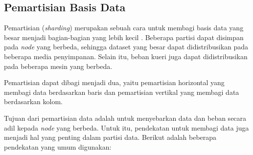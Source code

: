 \subsection{Pemartisian Basis Data}

Pemartisian (\textit{sharding}) merupakan sebuah cara untuk membagi basis data yang besar menjadi bagian-bagian yang lebih kecil \parencite{dataIntensiveApplications}. Beberapa partisi dapat disimpan pada \textit{node} yang berbeda, sehingga dataset yang besar dapat didistribusikan pada beberapa media penyimpanan. Selain itu, beban kueri juga dapat didistribusikan pada beberapa mesin yang berbeda.

Pemartisian dapat dibagi menjadi dua, yaitu pemartisian horizontal yang membagi data berdasarkan baris dan pemartisian vertikal yang membagi data berdasarkan kolom.

Tujuan dari pemartisian data adalah untuk menyebarkan data dan beban secara adil kepada \textit{node} yang berbeda. Untuk itu, pendekatan untuk membagi data juga menjadi hal yang penting dalam partisi data. Berikut adalah beberapa pendekatan yang umum digunakan:

